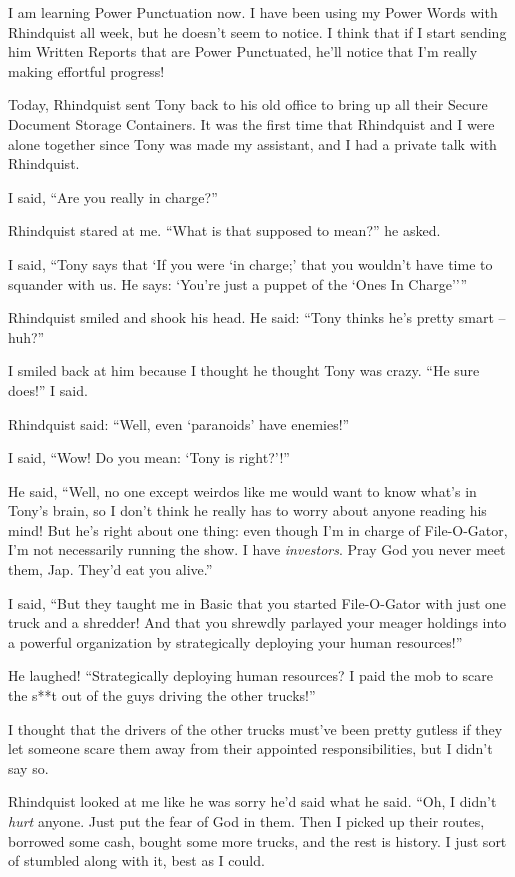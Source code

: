 I am learning Power Punctuation now. I have been using my Power Words 
with Rhindquist all week, but he doesn't seem to notice. I think that 
if I start sending him Written Reports that are Power Punctuated, he'll 
notice that I'm really making effortful progress!

Today, Rhindquist sent Tony back to his old office to bring up all 
their Secure Document Storage Containers. It was the first time that 
Rhindquist and I were alone together since Tony was made my assistant, 
and I had a private talk with Rhindquist.

I said, “Are you really in charge?”

Rhindquist stared at me. “What is that supposed to mean?” he asked.

I said, “Tony says that `If you were `in charge;' that you wouldn't 
have time to squander with us. He says: `You're just a puppet of the 
`Ones In Charge''”

Rhindquist smiled and shook his head. He said: “Tony thinks he's 
pretty smart -- huh?”

I smiled back at him because I thought he thought Tony was crazy. “He 
sure does!” I said.

Rhindquist said: “Well, even `paranoids' have enemies!”

I said, “Wow! Do you mean: `Tony is right?'!”

He said, “Well, no one except weirdos like me would want to know 
what's in Tony's brain, so I don't think he really has to worry about 
anyone reading his mind! But he's right about one thing: even though 
I'm in charge of File-O-Gator, I'm not necessarily running the show. I 
have \emph{investors}. Pray God you never meet them, Jap. They'd eat 
you alive.”

I said, “But they taught me in Basic that you started File-O-Gator 
with just one truck and a shredder! And that you shrewdly parlayed your 
meager holdings into a powerful organization by strategically deploying 
your human resources!”

He laughed! “Strategically deploying human resources? I paid the mob 
to scare the s**t out of the guys driving the other trucks!”

I thought that the drivers of the other trucks must've been pretty 
gutless if they let someone scare them away from their appointed 
responsibilities, but I didn't say so.

Rhindquist looked at me like he was sorry he'd said what he said. 
“Oh, I didn't \emph{hurt} anyone. Just put the fear of God in them. 
Then I picked up their routes, borrowed some cash, bought some more 
trucks, and the rest is history. I just sort of stumbled along with it, 
best as I could.

